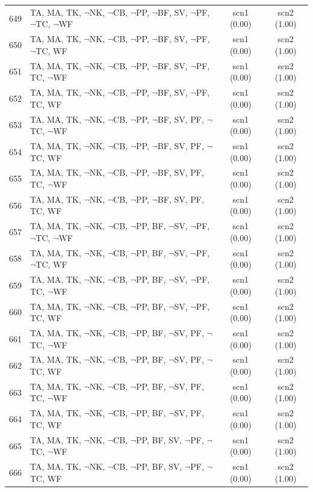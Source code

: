 \documentclass[12pt]{article}
\begin{document}
\begin{longtable}{|l|l|c|c|}
649 & TA, MA, TK, $\neg$NK, $\neg$CB, $\neg$PP, $\neg$BF, SV, $\neg$PF, $\neg$TC, $\neg$WF & scn1 (0.00) & scn2 (1.00)\\
650 & TA, MA, TK, $\neg$NK, $\neg$CB, $\neg$PP, $\neg$BF, SV, $\neg$PF, $\neg$TC, WF & scn1 (0.00) & scn2 (1.00)\\
651 & TA, MA, TK, $\neg$NK, $\neg$CB, $\neg$PP, $\neg$BF, SV, $\neg$PF, TC, $\neg$WF & scn1 (0.00) & scn2 (1.00)\\
652 & TA, MA, TK, $\neg$NK, $\neg$CB, $\neg$PP, $\neg$BF, SV, $\neg$PF, TC, WF & scn1 (0.00) & scn2 (1.00)\\
653 & TA, MA, TK, $\neg$NK, $\neg$CB, $\neg$PP, $\neg$BF, SV, PF, $\neg$TC, $\neg$WF & scn1 (0.00) & scn2 (1.00)\\
654 & TA, MA, TK, $\neg$NK, $\neg$CB, $\neg$PP, $\neg$BF, SV, PF, $\neg$TC, WF & scn1 (0.00) & scn2 (1.00)\\
655 & TA, MA, TK, $\neg$NK, $\neg$CB, $\neg$PP, $\neg$BF, SV, PF, TC, $\neg$WF & scn1 (0.00) & scn2 (1.00)\\
656 & TA, MA, TK, $\neg$NK, $\neg$CB, $\neg$PP, $\neg$BF, SV, PF, TC, WF & scn1 (0.00) & scn2 (1.00)\\
657 & TA, MA, TK, $\neg$NK, $\neg$CB, $\neg$PP, BF, $\neg$SV, $\neg$PF, $\neg$TC, $\neg$WF & scn1 (0.00) & scn2 (1.00)\\
658 & TA, MA, TK, $\neg$NK, $\neg$CB, $\neg$PP, BF, $\neg$SV, $\neg$PF, $\neg$TC, WF & scn1 (0.00) & scn2 (1.00)\\
659 & TA, MA, TK, $\neg$NK, $\neg$CB, $\neg$PP, BF, $\neg$SV, $\neg$PF, TC, $\neg$WF & scn1 (0.00) & scn2 (1.00)\\
660 & TA, MA, TK, $\neg$NK, $\neg$CB, $\neg$PP, BF, $\neg$SV, $\neg$PF, TC, WF & scn1 (0.00) & scn2 (1.00)\\
661 & TA, MA, TK, $\neg$NK, $\neg$CB, $\neg$PP, BF, $\neg$SV, PF, $\neg$TC, $\neg$WF & scn1 (0.00) & scn2 (1.00)\\
662 & TA, MA, TK, $\neg$NK, $\neg$CB, $\neg$PP, BF, $\neg$SV, PF, $\neg$TC, WF & scn1 (0.00) & scn2 (1.00)\\
663 & TA, MA, TK, $\neg$NK, $\neg$CB, $\neg$PP, BF, $\neg$SV, PF, TC, $\neg$WF & scn1 (0.00) & scn2 (1.00)\\
664 & TA, MA, TK, $\neg$NK, $\neg$CB, $\neg$PP, BF, $\neg$SV, PF, TC, WF & scn1 (0.00) & scn2 (1.00)\\
665 & TA, MA, TK, $\neg$NK, $\neg$CB, $\neg$PP, BF, SV, $\neg$PF, $\neg$TC, $\neg$WF & scn1 (0.00) & scn2 (1.00)\\
666 & TA, MA, TK, $\neg$NK, $\neg$CB, $\neg$PP, BF, SV, $\neg$PF, $\neg$TC, WF & scn1 (0.00) & scn2 (1.00)\\

\end{longtable}
\end{document}
